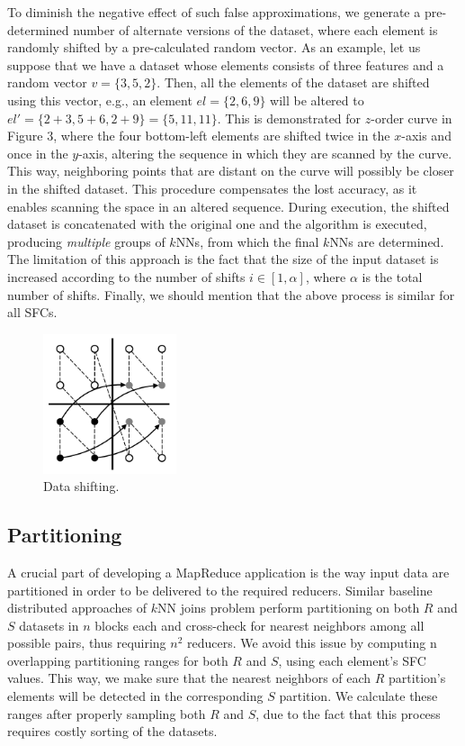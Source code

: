 To diminish the negative effect of such false approximations, we generate a pre-determined number of alternate versions of the dataset, where each element is randomly shifted by a pre-calculated random vector. As an example, let us suppose that we have a dataset whose elements consists of three features and a random vector $v=\{3, 5, 2\}$. Then, all the elements of the dataset are shifted using this vector, e.g., an element $el=\{2, 6, 9\}$ will be altered to $el'=\{2+3, 5+6, 2+9\}=\{5, 11, 11\}$. This is demonstrated for $z$-order curve in Figure 3, where the four bottom-left elements are shifted twice in the $x$-axis and once in the $y$-axis, altering the sequence in which they are scanned by the curve. This way, neighboring points that are distant on the curve will possibly be closer in the shifted dataset. This procedure compensates the lost accuracy, as it enables scanning the space in an altered sequence. During execution, the shifted dataset is concatenated with the original one and the algorithm is executed, producing \textit{multiple} groups of $k$NNs, from which the final $k$NNs are determined. The limitation of this approach is the fact that the size of the input dataset is increased according to the number of shifts $i\in{[1, \alpha]}$, where $\alpha$ is the total number of shifts. Finally, we should mention that the above process is similar for all SFCs.

\begin{figure}[!tb]
	\centering
	\includegraphics[width=0.35\textwidth]{figures/figure3.pdf}
	\caption{Data shifting.}
	\label{figure3}
\end{figure}

\subsection{Partitioning}
A crucial part of developing a MapReduce application is the way input data are partitioned in order to be delivered to the required reducers. Similar baseline distributed approaches of $k$NN joins problem perform partitioning on both $R$ and $S$ datasets in $n$ blocks each and cross-check for nearest neighbors among all possible pairs, thus requiring $n^2$ reducers. We avoid this issue by computing n overlapping partitioning ranges for both $R$ and $S$, using each element’s SFC values. This way, we make sure that the nearest neighbors of each $R$ partition’s elements will be detected in the corresponding $S$ partition. We calculate these ranges after properly sampling both $R$ and $S$, due to the fact that this process requires costly sorting of the datasets.

